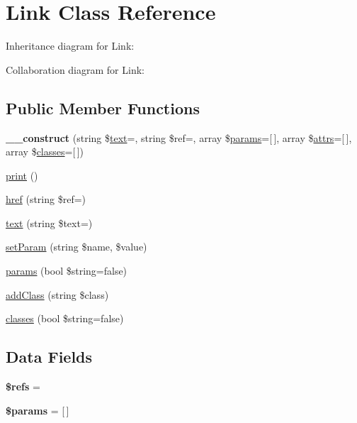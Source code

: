 \hypertarget{class_html_1_1_link}{}\section{Link Class Reference}
\label{class_html_1_1_link}


Inheritance diagram for Link\+:


Collaboration diagram for Link\+:
\subsection*{Public Member Functions}
\begin{DoxyCompactItemize}
\item 
\mbox{\label{class_html_1_1_link_af17abe69a60a77b0891506c3bbc208ec}} 
{\bfseries \+\_\+\+\_\+construct} (string \$\hyperlink{class_html_1_1_link_ab7fdada65bce8f1069e5cbbbf532ca8f}{text}=\textquotesingle{}\textquotesingle{}, string \$ref=\textquotesingle{}\textquotesingle{}, array \$\hyperlink{class_html_1_1_link_a781949bb79e8bfc4148fcc40c6b9fb3b}{params}=\mbox{[}$\,$\mbox{]}, array \$\hyperlink{class_html_1_1_html_tag_a75ef0c456595eaa6a574c438803fb072}{attrs}=\mbox{[}$\,$\mbox{]}, array \$\hyperlink{class_html_1_1_link_af6ac36c4e10b38c61aa0b45fa736bfc4}{classes}=\mbox{[}$\,$\mbox{]})
\item 
\hyperlink{class_html_1_1_link_a43374e600f552e0a9308ab96b1964aba}{print} ()
\item 
\hyperlink{class_html_1_1_link_acca9a5a3248aa2412373b1fe3a7e2a01}{href} (string \$ref=\textquotesingle{}\textquotesingle{})
\item 
\hyperlink{class_html_1_1_link_ab7fdada65bce8f1069e5cbbbf532ca8f}{text} (string \$text=\textquotesingle{}\textquotesingle{})
\item 
\hyperlink{class_html_1_1_link_a3a12152c8947fb47e6833a6e1164c730}{set\+Param} (string \$name, \$value)
\item 
\hyperlink{class_html_1_1_link_a781949bb79e8bfc4148fcc40c6b9fb3b}{params} (bool \$string=false)
\item 
\hyperlink{class_html_1_1_link_a45453935ed565c45623fb7b8b8c9810b}{add\+Class} (string \$class)
\item 
\hyperlink{class_html_1_1_link_af6ac36c4e10b38c61aa0b45fa736bfc4}{classes} (bool \$string=false)
\end{DoxyCompactItemize}
\subsection*{Data Fields}
\begin{DoxyCompactItemize}
\item 
\mbox{\label{class_html_1_1_link_a8f8757e72f75875c4520aa66624dfae2}} 
{\bfseries \$refs} = \textquotesingle{}\textquotesingle{}
\item 
\mbox{\label{class_html_1_1_link_afe68e6fbe7acfbffc0af0c84a1996466}} 
{\bfseries \$params} = \mbox{[}$\,$\mbox{]}
\end{DoxyCompactItemize}
